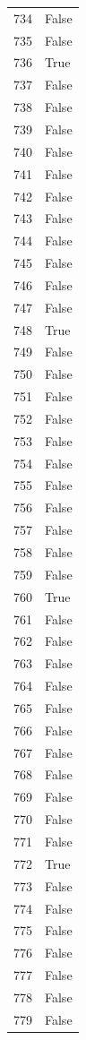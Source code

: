 \documentclass[
  letterpaper,
  DIV=11,
  numbers=noendperiod]{scrreprt}
\begin{document}
\begin{tabular}{ll}
734  &  False \\
735  &  False \\
736  &   True \\
737  &  False \\
738  &  False \\
739  &  False \\
740  &  False \\
741  &  False \\
742  &  False \\
743  &  False \\
744  &  False \\
745  &  False \\
746  &  False \\
747  &  False \\
748  &   True \\
749  &  False \\
750  &  False \\
751  &  False \\
752  &  False \\
753  &  False \\
754  &  False \\
755  &  False \\
756  &  False \\
757  &  False \\
758  &  False \\
759  &  False \\
760  &   True \\
761  &  False \\
762  &  False \\
763  &  False \\
764  &  False \\
765  &  False \\
766  &  False \\
767  &  False \\
768  &  False \\
769  &  False \\
770  &  False \\
771  &  False \\
772  &   True \\
773  &  False \\
774  &  False \\
775  &  False \\
776  &  False \\
777  &  False \\
778  &  False \\
779  &  False \\

\end{tabular}
\end{document}
